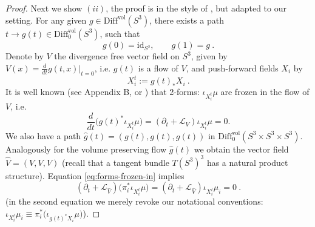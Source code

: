 \documentclass[12pt]{article}
\newcommand{\no}{\noindent}
\begin{document}
\begin{proof}
\no Next we show $(ii)$, the proof is in the style of 
\cite{Berger90, Mayer03}, but adapted to our setting. For any given $g\in \text{Diff}^\text{vol}(S^3)$, there exists a path $t\longrightarrow g(t)\in \text{Diff}^\text{vol}_0(S^3)$,
such that
\[
 g(0)=\text{id}_{S^3},\qquad g(1)=g\ .
\]
 Denote by $V$ the divergence free vector field on $S^3$, given by $V(x)=\frac{d}{dt} g(t,x)|_{t=0}$, i.e. $g(t)$ is a flow of $V$, and push-forward fields $X_i$ by 
\[
 X^t_i:=g(t)_\ast X_i\ .
\]
It is well known (see Appendix B, or \cite[p. 224]{Freedman91-2})
 that 2-forms: $\iota_{X^t_i}\mu$ are frozen in the flow of $V$, i.e.
\begin{equation}\label{eq:forms-frozen-in}
 \frac{d}{dt}\bigl(g(t)^\ast\iota_{X^t_i}\mu\bigr) =(\partial_t+\mathcal{L}_V) \iota_{X^t_i}\mu = 0.
\end{equation} 
We also have a path $\hat{g}(t)=(g(t),g(t),g(t))$ in $\text{Diff}^\text{vol}_0(S^3\times S^3\times S^3)$.
 Analogously for the volume preserving flow $\hat{g}(t)$ we obtain the vector field $\hat{V}=(V,V,V)$ (recall that a tangent bundle $T(S^3)^3$ has a natural product structure). Equation \eqref{eq:forms-frozen-in} implies
\begin{equation}\label{eq:forms-frozen-in2}
(\partial_t+\mathcal{L}_{\hat{V}}) \bigl(\pi^\ast_i\iota_{X^t_i}\mu\bigr)=(\partial_t+\mathcal{L}_{\hat{V}}) \iota_{X^t_i}\mu_i= 0\ .
\end{equation} 
(in the second equation we merely revoke our notational conventions: $\iota_{X^t_i}\mu_i\equiv\pi^\ast_i\bigl(\iota_{g(t)^\ast X_i}\mu\bigr)$).


\end{proof}
\end{document}
